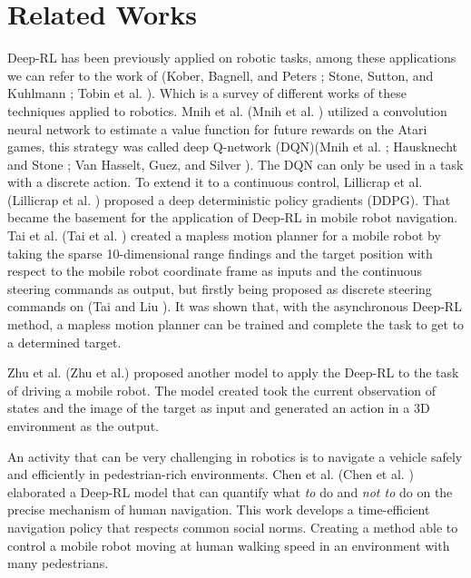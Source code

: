 \section*{Related Works}

Deep-RL has been previously applied on robotic tasks, among these applications we can refer to the work of (Kober, Bagnell, and Peters \citeyear{kober2013reinforcement}; Stone, Sutton, and Kuhlmann \citeyear{stone2005reinforcement}; Tobin et al. \citeyear{tobin2017domain}).
Which is a survey of different works of these techniques applied to robotics.
Mnih et al. (Mnih et al. \citeyear{mnih2013playing}) utilized a convolution neural network to estimate a value function for future rewards on the Atari games, this strategy was called deep Q-network (DQN)(Mnih et al. \citeyear{mnih2013playing}; Hausknecht and Stone \citeyear{hausknecht2015deep}; Van Hasselt, Guez, and Silver \citeyear{van2016deep}).
The DQN can only be used in a task with a discrete action.
To extend it to a continuous control, Lillicrap et al. (Lillicrap et al. \citeyear{lillicrap2015continuous}) proposed a deep deterministic policy gradients (DDPG).
That became the basement for the application of Deep-RL in mobile robot navigation.
Tai et al. (Tai et al. \citeyear{tai2017virtual}) created a mapless motion planner for a mobile robot by taking the sparse 10-dimensional range findings and the target position with respect to the mobile robot coordinate frame as inputs and the continuous steering commands as output, but firstly being proposed as discrete steering commands on (Tai and Liu \citeyear{tai2016towards}). It was shown that, with the asynchronous Deep-RL method, a mapless motion planner can be trained and complete the task to get to a determined target. 

Zhu et al. (Zhu et al.\citeyear{zhu2017target}) proposed another model to apply the Deep-RL to the task of driving a mobile robot.
The model created took the current observation of states and the image of the target as input and generated an action in a 3D environment as the output.

An activity that can be very challenging in robotics is to navigate a vehicle safely and efficiently in pedestrian-rich environments. Chen et al. (Chen et al. \citeyear{chen2017socially}) elaborated a Deep-RL model that can quantify what \textit{to} do and \textit{not to} do on the precise mechanism of human  navigation.
This work develops a time-efficient navigation policy that respects common social norms.
Creating a method able to control a mobile robot moving at human walking speed in an environment with many pedestrians.